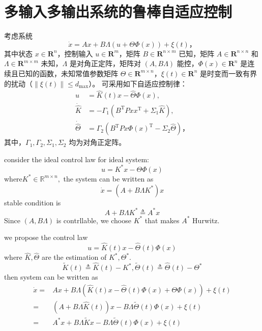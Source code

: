 \chapter{多输入多输出系统的鲁棒自适应控制} \label{MIMO_robust}


考虑系统
\[
    \dot{x} = A x + B \Lambda (u + \Theta \Phi(x)) + \xi(t) \text{，}
\]
其中状态 $x \in \mathbf{R}^n$，控制输入 $u \in \mathbf{R}^m$，矩阵 $B \in \mathbf{R}^{n \times m}$ 已知，矩阵 $A \in \mathbf{R}^{n \times n}$ 和 $\Lambda \in \mathbf{R}^{m \times m}$ 未知，$\Lambda$ 是对角正定阵，矩阵对 $(A, B \Lambda)$ 能控，$\Phi(x) \in \mathbf{R}^n$ 是连续且已知的函数，未知常值参数矩阵 $\Theta \in \mathbf{R}^{m \times n}$，$\xi(t) \in \mathbf{R}^n$ 是时变而一致有界的扰动（$\| \xi(t) \| \leq d_{\mathrm{max}}$）。%
可采用如下自适应控制律：
\begin{align*}
    u &= \hat{K}(t)x - \hat{\Theta}\Phi(x), \\
    \dot{\hat{K}} &= - \Gamma_1 (B^\mathrm{T} P x x^\mathrm{T} + \Sigma_1\hat{K}), \\
    \dot{\hat{\Theta}} &= \Gamma_2(B^\mathrm{T} P x \Phi(x)^\mathrm{T} - \Sigma_2 \hat{\Theta}) \text{，}
\end{align*}
其中，$\Gamma_1, \Gamma_2, \Sigma_1, \Sigma_2$ 均为对角正定阵。



consider the ideal control law for ideal system:
$$u=K^*x-\Theta\Phi(x)$$
where$K^* \in \mathbb{R}^{m \times n },$ the system can be written as $$\dot{x}=(A  + B \Lambda K^*)x$$
    stable condition  is $$A  + B \Lambda K^*\triangleq A^*x$$ Since $(A,B\Lambda)$ is contrllable, we choose $K^*$ that makes $A^*$ Hurwitz.

    
    we propose the control law$$u =\hat K(t)x-\hat \Theta(t)\Phi(x)$$ where $\hat{K},\hat{\Theta}$ are the estimation of $K^*,\Theta^*$.
    $$\tilde{K}(t)\triangleq\hat{K}(t)-K^*,\tilde{\Theta}(t)\triangleq\hat{\Theta}(t)-\Theta^*$$
     then system can be written as
     \begin{align*}
         \dot{x}=&Ax+B\Lambda (\hat K(t)x-\hat \Theta(t)\Phi(x)+\Theta\Phi(x))+\xi(t)\\
         =&(A+B\Lambda\hat K(t))x-B\Lambda \tilde \Theta(t)\Phi(x)+\xi(t)\\
         =&A^*x+B\Lambda\tilde{K}x-B\Lambda \tilde \Theta(t)\Phi(x)+\xi(t)
     \end{align*}

